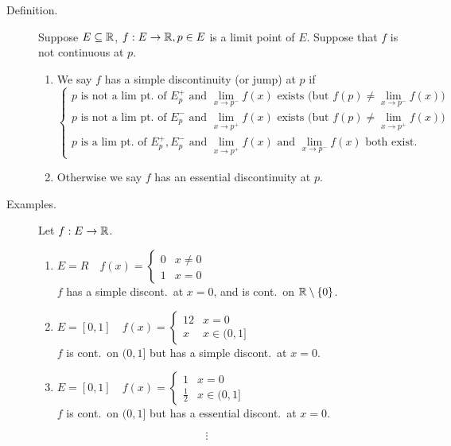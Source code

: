 \documentclass[letterpaper,11pt]{article}
\begin{document}
\begin{description}
\item[Definition.] Suppose $E\subseteq\mathbb{R}$, $f:E\to\mathbb{R},p\in E$ is a limit point of $E$.
    Suppose that $f$ is not continuous at $p$.
    \begin{enumerate}
    \item We say $f$ has a simple discontinuity (or jump) at $p$ if
       \[
       \begin{cases}
       \text{$p$ is not a lim pt.\ of $E_p^+$ and $\lim_{x\to p^-}f(x)$ exists
         (but $f(p)\ne\lim_{x\to p^-}f(x)$)}\\
       \text{$p$ is not a lim pt.\ of $E_p^-$ and $\lim_{x\to p^+}f(x)$ exists
         (but $f(p)\ne\lim_{x\to p^+}f(x)$)}\\
       \text{$p$ is a lim pt.\ of $E_p^+,E_p^-$ and $\lim_{x\to p^+}f(x)$ and
         $\lim_{x\to p^-}f(x)$ both exist.}
       \end{cases}
       \]
    \item Otherwise we say $f$ has an essential discontinuity at $p$.
    \end{enumerate}

\item[Examples.] Let $f:E\to\mathbb{R}$.
  \begin{enumerate}
  \item $E=R\quad f(x)=\begin{cases}
    0 & x\ne0\\
    1 & x=0
    \end{cases}\qquad$\\
    $f$ has a simple discont.\ at $x=0$, and is cont.\ on $\mathbb{R}\setminus\{0\}$.
  \item $E=[0,1]\quad f(x)=\begin{cases}
    12 & x=0\\
    x & x\in(0,1]
    \end{cases}\qquad$\\
    $f$ is cont.\ on $(0,1]$ but has a simple discont.\ at $x=0$.
  \item $E=[0,1]\quad f(x)=\begin{cases}
    1 & x=0\\
    \frac{1}{2} & x\in (0,1]
    \end{cases}\qquad$\\
    $f$ is cont.\ on $(0,1]$ but has a essential discont.\ at $x=0$.
  \end{enumerate}

\end{description}
\[
\vdots
\]
\end{document}
